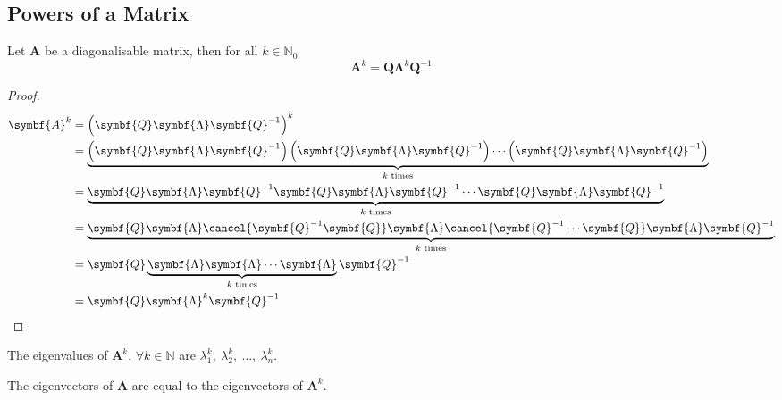 \documentclass{article}
\begin{document}
\subsection{Powers of a Matrix}
\begin{theorem}
    Let \(\symbf{A}\) be a diagonalisable matrix, then for all
    \(k \in \mathbb{N}_0\)
    \begin{equation*}
        \symbf{A}^k = \symbf{Q} \symbf{\Lambda}^k \symbf{Q}^{-1}
    \end{equation*}
\end{theorem}
\begin{proof}
    \begin{align*}
        \symbf{A}^k & = \left( \symbf{Q} \symbf{\Lambda} \symbf{Q}^{-1} \right)^k                                                                                                                                                     \\
                    & = \underbrace{\left( \symbf{Q} \symbf{\Lambda} \symbf{Q}^{-1} \right)\left( \symbf{Q} \symbf{\Lambda} \symbf{Q}^{-1} \right)\cdots\left( \symbf{Q} \symbf{\Lambda} \symbf{Q}^{-1} \right)}_{\text{\(k\) times}} \\
                    & = \underbrace{\symbf{Q} \symbf{\Lambda} \symbf{Q}^{-1} \symbf{Q} \symbf{\Lambda} \symbf{Q}^{-1} \cdots \symbf{Q} \symbf{\Lambda} \symbf{Q}^{-1} }_{\text{\(k\) times}}                                          \\
                    & = \underbrace{\symbf{Q} \symbf{\Lambda} \cancel{\symbf{Q}^{-1} \symbf{Q}} \symbf{\Lambda} \cancel{\symbf{Q}^{-1} \cdots \symbf{Q}} \symbf{\Lambda} \symbf{Q}^{-1} }_{\text{\(k\) times}}                        \\
                    & = \symbf{Q} \underbrace{ \symbf{\Lambda} \symbf{\Lambda} \cdots \symbf{\Lambda} }_{\text{\(k\) times}}\symbf{Q}^{-1}                                                                                            \\
                    & = \symbf{Q} \symbf{\Lambda}^k\symbf{Q}^{-1}
    \end{align*}
\end{proof}
\begin{theorem}
    The eigenvalues of \(\symbf{A}^k\), \(\forall k \in \mathbb{N}\)
    are \(\lambda_1^k,\: \lambda_2^k,\: \dots,\: \lambda_n^k\).
\end{theorem}
\begin{theorem}
    The eigenvectors of \(\symbf{A}\) are equal to the eigenvectors of
    \(\symbf{A}^k\).
\end{theorem}
\newpage
\end{document}
